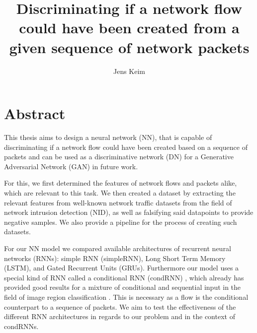 \documentclass[
	ngerman,
	ruledheaders=section,%
	class=report,%
	thesis={type=bachelor},%
	accentcolor=9c,%
	custommargins=true,%
	marginpar=false,%
	parskip=half-,%
	fontsize=11pt,%
	twoside
]{tudapub}
\begin{document}

\title{Discriminating if a network flow could have been created from a given sequence of network packets}
\author[J. Keim]{Jens Keim}%


\submissiondate{\today}
\examdate{\today}


\maketitle

\affidavit

\tableofcontents

\chapter{Abstract}
\label{sec:abstract}

This thesis aims to design a neural network (NN), that is capable of discriminating if a network flow could have been created based on a sequence of packets and can be used as a discriminative network (DN) for a Generative Adversarial Network (GAN) in future work.

For this, we first determined the features of network flows and packets alike, which are relevant to this task.
We then created a dataset by extracting the relevant features from well-known network traffic datasets from the field of network intrusion detection (NID), as well as falsifying said datapoints to provide negative samples.
We also provide a pipeline for the process of creating such datasets.

For our NN model we compared available architectures of recurrent neural networks (RNNs): simple RNN (simpleRNN), Long Short Term Memory (LSTM), and Gated Recurrent Units (GRUs).
Furthermore our model uses a special kind of RNN called a conditional RNN (condRNN) \cite{remyPhilipperemyCondRnn2020}, which already has provided good results for a mixture of conditional and sequential input in the field of image region classification \cite{karpathyDeepVisualSemanticAlignments2015} \cite{vinyalsShowTellNeural2015}.
This is necessary as a flow is the conditional counterpart to a sequence of packets.
We aim to test the effectiveness of the different RNN architectures in regards to our problem and in the context of condRNNs.
\end{document}
